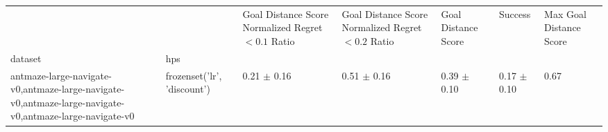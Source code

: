 \begin{tabular}{lllllll}
\toprule
 &  & Goal Distance Score Normalized Regret $< 0.1$ Ratio & Goal Distance Score Normalized Regret $< 0.2$ Ratio & Goal Distance Score & Success & Max Goal Distance Score \\
dataset & hps &  &  &  &  &  \\
\midrule
antmaze-large-navigate-v0,antmaze-large-navigate-v0,antmaze-large-navigate-v0,antmaze-large-navigate-v0 & frozenset({'lr', 'discount'}) & 0.21 $\pm$ 0.16 & 0.51 $\pm$ 0.16 & 0.39 $\pm$ 0.10 & 0.17 $\pm$ 0.10 & 0.67 \\
\cline{1-7}
\bottomrule
\end{tabular}
